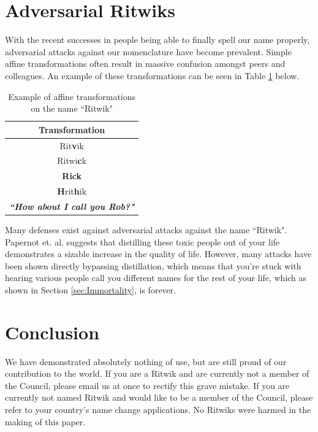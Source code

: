 \documentclass[]{article}
\begin{document}
\section{Adversarial Ritwiks}
With the recent successes in people being able to finally spell our name properly, adversarial attacks against our nomenclature have become prevalent. Simple affine transformations often result in massive confusion amongst peers and colleagues. An example of these transformations can be seen in Table \ref{table:affineadversarial} below.
\begin{table}[h]
\centering
\begin{tabular}{|c|}
	\hline 
	\textbf{Transformation}\\ 
	\hline 
	Rit\textbf{v}ik\\ 
	\hline 
	Ritwi\textbf{c}k\\
	\hline
	\textbf{Rick}\\
	\hline
	\textbf{H}rit\textbf{h}ik\\
	\hline
	\textbf{\textit{``How about I call you Rob?"}}\\
	\hline
\end{tabular}
\caption{Example of affine transformations on the name ``Ritwik"}
\label{table:affineadversarial}
\end{table}
Many defenses exist against adversarial attacks against the name ``Ritwik". Papernot et. al. \cite{Papernot} suggests that distilling these toxic people out of your life demonstrates a sizable increase in the quality of life. However, many attacks have been shown directly bypassing distillation, which means that you're stuck with hearing various people call you different names for the rest of your life, which as shown in Section \ref{sec:Immortality}, is forever.

\section{Conclusion}
We have demonstrated absolutely nothing of use, but are still proud of our contribution to the world. If you are a Ritwik and are currently not a member of the Council, please email us at once to rectify this grave mistake. If you are currently not named Ritwik and would like to be a member of the Council, please refer to your country's name change applications. No Ritwiks were harmed in the making of this paper.



\end{document}
